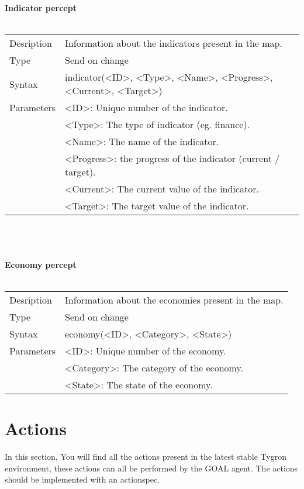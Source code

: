 \documentclass[english,11pt]{report}
\begin{document}
\textbf{Indicator percept}\\
\\
\begin{tabularx}{\textwidth}{lX}
 Desription & Information about the indicators present in the map. \\
 Type & Send on change \\
 Syntax & indicator(<ID>, <Type>, <Name>, <Progress>, <Current>, <Target>) \\
 Parameters &   <ID>: Unique number of the indicator.\\
            &   <Type>: The type of indicator (eg. finance).\\
            &   <Name>: The name of the indicator.\\
            &   <Progress>: the progress of the indicator (current / target).\\
            &   <Current>: The current value of the indicator.\\
            &   <Target>: The target value of the indicator.
\end{tabularx}\\
\\
\\
\textbf{Economy percept}\\
\\
\begin{tabularx}{\textwidth}{lX}
 Desription & Information about the economies present in the map. \\
 Type & Send on change \\
 Syntax & economy(<ID>, <Category>, <State>) \\
 Parameters &   <ID>: Unique number of the economy.\\
            &   <Category>: The category of the economy.\\
            &   <State>: The state of the economy.
\end{tabularx}


\chapter{Actions}

In this section, You will find all the actions present in the latest stable Tygron environment, these actions can all be performed by the GOAL agent. The actions should be implemented with an actionspec.
\end{document}
